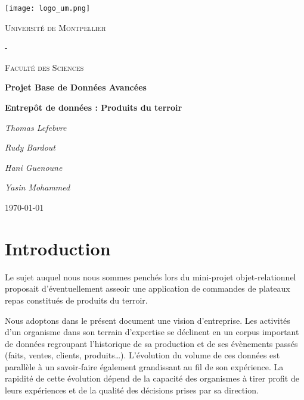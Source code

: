 \documentclass[11pt]{article}
\begin{document}
\begin{titlepage}

    \begin{flushleft}
        \texttt{[image: logo\_um.png]}
    \end{flushleft}

    \centering
	{\scshape\large Université de Montpellier \par}
	\vspace{0.2cm}
	{\scshape\large - \par}
	\vspace{0.2cm}
	{\scshape\large Faculté des Sciences \par}
	\vspace{5cm}
	{\huge\bfseries Projet Base de Données Avancées\par}
	\vspace{0.5cm}
	{\huge\bfseries Entrepôt de données : Produits du terroir\par}
	\vspace{5cm}
	{\Large\itshape Thomas Lefebvre\par}
	\vspace{0.5cm}
	{\Large\itshape Rudy Bardout\par}
	\vspace{0.5cm}
	{\Large\itshape Hani Guenoune\par}
	\vspace{0.5cm}
	{\Large\itshape Yasin Mohammed\par}
	\vfill
	{\large \today\par}
\end{titlepage}
\newpage

\tableofcontents
\newpage

 \section{Introduction}


Le sujet auquel nous nous sommes penchés lors du mini-projet objet-relationnel proposait d’éventuellement asseoir une application de commandes de plateaux repas constitués de produits du terroir. 

Nous adoptons dans le présent document une vision d’entreprise. Les activités d’un organisme dans son terrain d’expertise se déclinent en un corpus important de données regroupant l’historique de sa production et de ses évènements passés (faits, ventes, clients, produits…).
L’évolution du volume de ces données est parallèle à un savoir-faire également grandissant au fil de son expérience. La rapidité de cette évolution dépend de la capacité des organismes à tirer profit de leurs expériences et de la qualité des décisions prises par sa direction.
\end{document}
